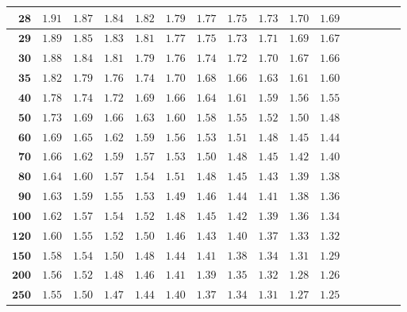 \begin{longtable}{|r|r|r|r|r|r|r|r|r|r|r|r|r|r|r|r|}
    \(\mathbf{28}\)& \(1.91\) & \(1.87\) & \(1.84\) & \(1.82\) & \(1.79\) & \(1.77\) & \(1.75\) & \(1.73\) & \(1.70\) & \(1.69\) \\ \hline 
    \(\mathbf{29}\)& \(1.89\) & \(1.85\) & \(1.83\) & \(1.81\) & \(1.77\) & \(1.75\) & \(1.73\) & \(1.71\) & \(1.69\) & \(1.67\) \\ \hline 
    \(\mathbf{30}\)& \(1.88\) & \(1.84\) & \(1.81\) & \(1.79\) & \(1.76\) & \(1.74\) & \(1.72\) & \(1.70\) & \(1.67\) & \(1.66\) \\ \hline 
    \(\mathbf{35}\)& \(1.82\) & \(1.79\) & \(1.76\) & \(1.74\) & \(1.70\) & \(1.68\) & \(1.66\) & \(1.63\) & \(1.61\) & \(1.60\) \\ \hline 
    \(\mathbf{40}\)& \(1.78\) & \(1.74\) & \(1.72\) & \(1.69\) & \(1.66\) & \(1.64\) & \(1.61\) & \(1.59\) & \(1.56\) & \(1.55\) \\ \hline 
    \(\mathbf{50}\)& \(1.73\) & \(1.69\) & \(1.66\) & \(1.63\) & \(1.60\) & \(1.58\) & \(1.55\) & \(1.52\) & \(1.50\) & \(1.48\) \\ \hline 
    \(\mathbf{60}\)& \(1.69\) & \(1.65\) & \(1.62\) & \(1.59\) & \(1.56\) & \(1.53\) & \(1.51\) & \(1.48\) & \(1.45\) & \(1.44\) \\ \hline 
    \(\mathbf{70}\)& \(1.66\) & \(1.62\) & \(1.59\) & \(1.57\) & \(1.53\) & \(1.50\) & \(1.48\) & \(1.45\) & \(1.42\) & \(1.40\) \\ \hline 
    \(\mathbf{80}\)& \(1.64\) & \(1.60\) & \(1.57\) & \(1.54\) & \(1.51\) & \(1.48\) & \(1.45\) & \(1.43\) & \(1.39\) & \(1.38\) \\ \hline 
    \(\mathbf{90}\)& \(1.63\) & \(1.59\) & \(1.55\) & \(1.53\) & \(1.49\) & \(1.46\) & \(1.44\) & \(1.41\) & \(1.38\) & \(1.36\) \\ \hline 
    \(\mathbf{100}\)& \(1.62\) & \(1.57\) & \(1.54\) & \(1.52\) & \(1.48\) & \(1.45\) & \(1.42\) & \(1.39\) & \(1.36\) & \(1.34\) \\ \hline 
    \(\mathbf{120}\)& \(1.60\) & \(1.55\) & \(1.52\) & \(1.50\) & \(1.46\) & \(1.43\) & \(1.40\) & \(1.37\) & \(1.33\) & \(1.32\) \\ \hline 
    \(\mathbf{150}\)& \(1.58\) & \(1.54\) & \(1.50\) & \(1.48\) & \(1.44\) & \(1.41\) & \(1.38\) & \(1.34\) & \(1.31\) & \(1.29\) \\ \hline 
    \(\mathbf{200}\)& \(1.56\) & \(1.52\) & \(1.48\) & \(1.46\) & \(1.41\) & \(1.39\) & \(1.35\) & \(1.32\) & \(1.28\) & \(1.26\) \\ \hline 
    \(\mathbf{250}\)& \(1.55\) & \(1.50\) & \(1.47\) & \(1.44\) & \(1.40\) & \(1.37\) & \(1.34\) & \(1.31\) & \(1.27\) & \(1.25\) \\ \hline 

\end{longtable}

